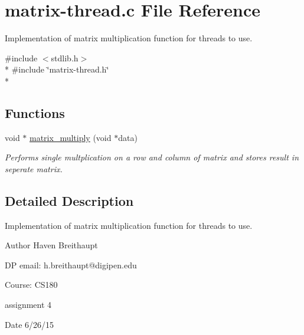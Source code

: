 \hypertarget{matrix-thread_8c}{\section{matrix-\/thread.c File Reference}
\label{matrix-thread_8c}
}


Implementation of matrix multiplication function for threads to use.  


{\ttfamily \#include $<$stdlib.\-h$>$}\\*
{\ttfamily \#include \char`\"{}matrix-\/thread.\-h\char`\"{}}\\*
\subsection*{Functions}
\begin{DoxyCompactItemize}
\item 
void $\ast$ \hyperlink{matrix-thread_8c_a85752b7afcbffcee8b67735793f8960a}{matrix\-\_\-multiply} (void $\ast$data)
\begin{DoxyCompactList}\small\item\em Performs single multplication on a row and column of matrix and stores result in seperate matrix. \end{DoxyCompactList}\end{DoxyCompactItemize}


\subsection{Detailed Description}
Implementation of matrix multiplication function for threads to use. \begin{DoxyAuthor}{Author}
Haven Breithaupt 
\end{DoxyAuthor}
\begin{DoxyParagraph}{D\-P email\-: h.breithaupt@digipen.edu}

\end{DoxyParagraph}
\begin{DoxyParagraph}{Course\-: C\-S180}

\end{DoxyParagraph}
\begin{DoxyParagraph}{assignment 4 }

\end{DoxyParagraph}
\begin{DoxyDate}{Date}
6/26/15 
\end{DoxyDate}


